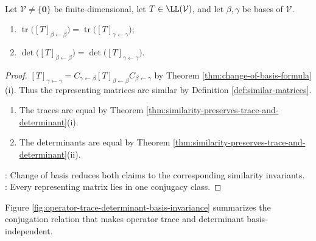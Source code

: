 \begin{theorem} \label{thm:operator-matrix-trace-determinant-basis-independent} \\
Let $\mathcal{V}\neq\{\mathbf{0}\}$ be finite-dimensional, let $T\in\LL(\mathcal{V})$, and let $\beta,\gamma$ be bases of $\mathcal{V}$.
\begin{enumerate}[label=(\roman*)]
\setlength{\itemsep}{0pt}
\item $\operatorname{tr}\bigl([T]_{\beta\leftarrow\beta}\bigr)=\operatorname{tr}\bigl([T]_{\gamma\leftarrow\gamma}\bigr)$;
\item $\det\bigl([T]_{\beta\leftarrow\beta}\bigr)=\det\bigl([T]_{\gamma\leftarrow\gamma}\bigr)$.
\end{enumerate}
\begin{proof}
$[T]_{\gamma\leftarrow\gamma}=C_{\gamma\leftarrow\beta}[T]_{\beta\leftarrow\beta}C_{\beta\leftarrow\gamma}$ by Theorem \ref{thm:change-of-basis-formula}(i). Thus the representing matrices are similar by Definition \ref{def:similar-matrices}.
\begin{enumerate}[label=(\roman*)]
\setlength{\itemsep}{0pt}
\item The traces are equal by Theorem \ref{thm:similarity-preserves-trace-and-determinant}(i).
\item The determinants are equal by Theorem \ref{thm:similarity-preserves-trace-and-determinant}(ii).
\end{enumerate}
: Change of basis reduces both claims to the corresponding similarity invariants.\\
: Every representing matrix lies in one conjugacy class.
\end{proof}
\end{theorem}

Figure \ref{fig:operator-trace-determinant-basis-invariance} summarizes the conjugation relation that makes operator trace and determinant basis-independent.

\begin{illustrationfigure}[H]
  \centering
  
  \caption{Basis changes conjugate matrices; trace and determinant are unchanged.}
  \label{fig:operator-trace-determinant-basis-invariance}
\end{illustrationfigure}

